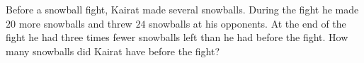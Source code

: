 Before a snowball fight, Kairat made several snowballs. During the fight he made $20$ more snowballs and threw $24$ snowballs at his opponents. At the end of the fight he had three times fewer snowballs left than he had before the fight. How many snowballs did Kairat have before the fight?
